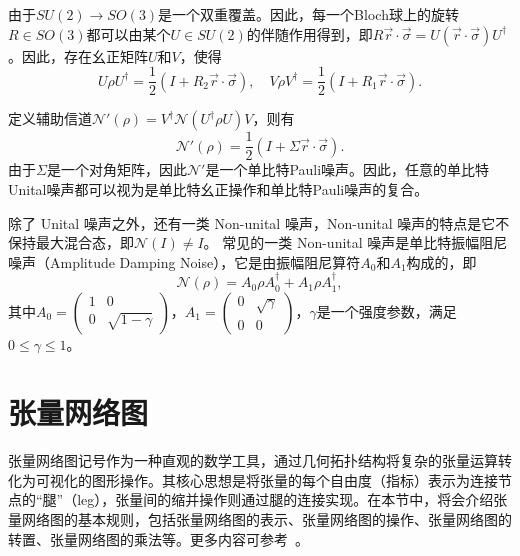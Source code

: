 由于$SU(2)\longrightarrow SO(3)$是一个双重覆盖。因此，每一个Bloch球上的旋转$R\in SO(3)$都可以由某个$U\in SU(2)$的伴随作用得到，即$R\vec{r}\cdot\vec{\sigma} = U (\vec{r}\cdot\vec{\sigma})U^\dagger$。因此，存在幺正矩阵$U$和$V$，使得
\begin{equation}
    U\rho U^\dagger = \frac{1}{2}(I + R_2\vec{r}\cdot\vec{\sigma}), \quad V\rho V^\dagger = \frac{1}{2}(I + R_1\vec{r}\cdot\vec{\sigma}).
\end{equation}

定义辅助信道$\mathcal{N'}(\rho) = V^\dagger \mathcal{N}(U^\dagger \rho U)V$，则有
\begin{equation}
    \mathcal{N'}(\rho) = \frac{1}{2}(I + \Sigma\vec{r}\cdot\vec{\sigma}).
\end{equation}
由于$\Sigma$是一个对角矩阵，因此$\mathcal{N'}$是一个单比特Pauli噪声。因此，任意的单比特Unital噪声都可以视为是单比特幺正操作和单比特Pauli噪声的复合。

除了 Unital 噪声之外，还有一类 Non-unital 噪声，Non-unital 噪声的特点是它不保持最大混合态，即$\mathcal{N}(I) \neq I$。
常见的一类 Non-unital 噪声是单比特振幅阻尼噪声（Amplitude Damping Noise），它是由振幅阻尼算符$A_0$和$A_1$构成的，即
\begin{equation}
    \mathcal{N}(\rho) = A_0\rho A_0^\dagger + A_1\rho A_1^\dagger,
\end{equation}
其中$A_0 = \begin{pmatrix} 1 & 0 \\ 0 & \sqrt{1-\gamma} \end{pmatrix}$，$A_1 = \begin{pmatrix} 0 & \sqrt{\gamma} \\ 0 & 0 \end{pmatrix}$，$\gamma$是一个强度参数，满足$0 \leq \gamma \leq 1$。


\section{张量网络图}


张量网络图记号作为一种直观的数学工具，通过几何拓扑结构将复杂的张量运算转化为可视化的图形操作。其核心思想是将张量的每个自由度（指标）表示为连接节点的“腿”（leg），张量间的缩并操作则通过腿的连接实现。在本节中，将会介绍张量网络图的基本规则，包括张量网络图的表示、张量网络图的操作、张量网络图的转置、张量网络图的乘法等。更多内容可参考~\cite{wood2011tensor}。




